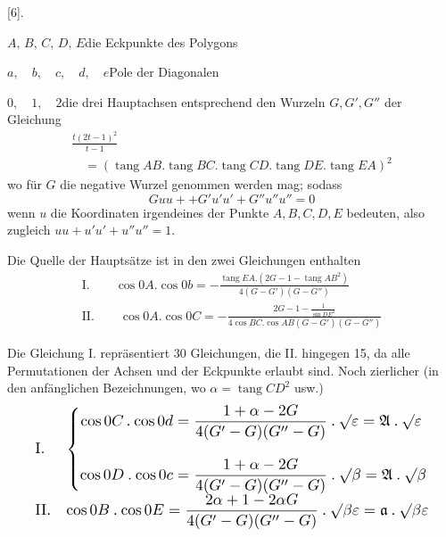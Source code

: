 \begingroup
\renewcommand{\arraystretch}{1.45}
\fancyhead[L]{}
\par\medskip{}\centerline{[6].}\nobreak\smallskip
\noindent\hspace*{2em}$A,\,B,\,C,\,D,\,E$\quad die Eckpunkte des Polygons\par
\noindent\hspace*{2em}$a,\quad b,\quad c,\quad d,\quad e$\quad Pole der Diagonalen\par
\noindent\hspace*{2em}$0,\quad1,\quad2$\quad die drei Hauptachsen entsprechend den Wurzeln
$G,G',G''$ der Gleichung
\[
\begin{gathered}\frac{t(2t-1)^2}{t-1}\\[9pt]\quad{}=(\operatorname{tang}AB\mathord{.}\operatorname{tang}BC\mathord{.}\operatorname{tang}CD\mathord{.}\operatorname{tang}DE\mathord{.}\operatorname{tang}EA)^2\end{gathered}
\]
wo für $G$ die negative Wurzel genommen werden mag; sodass
\[
Guu++G'u'u'+G''u''u''=0
\]
wenn $u$ die Koordinaten irgendeines der Punkte $A,B,C,D,E$ bedeuten,
also zugleich $uu+u'u'+u''u''=1$.


Die Quelle der Hauptsätze ist in den zwei Gleichungen enthalten
\[
\begin{gathered} \text{I.}\qquad\cos0A\mathord{.}\cos0b=-\frac{\operatorname{tang}EA\mathord{.}(2G-1-\operatorname{tang}AB^2)}{4(G-G')(G-G'')}\\[9pt] \text{II.}\qquad\cos0A\mathord{.}\cos0C=-\frac{2G-1-\frac{1}{\sin DE^2}}{4\cos BC\mathord{.}\cos AB(G-G')(G-G'')} \end{gathered}
\]



Die Gleichung I. repräsentiert 30 Gleichungen, die II. hingegen 15, da alle
Permutationen der Achsen und der Eckpunkte erlaubt sind. Noch zierlicher
(in den anfänglichen Bezeichnungen, wo $\alpha=\operatorname{tang}CD^2$ usw.)
\begingroup\small\setlength{\arraycolsep}{3pt}\[
\resizebox{.95\linewidth}{!}{$\displaystyle \begin{array}{ll} \mathrm{I.}&\left\{\begin{aligned} \cos 0C\mathbin{.}\cos 0d&=\frac{1+\alpha-2G}{4(G'-G)(G''-G)}\mathbin{.}\surd\varepsilon=\mathfrak{A}\mathbin{.}\surd\varepsilon\\[9pt] \cos 0D\mathbin{.}\cos 0c&=\frac{1+\alpha-2G}{4(G'-G)(G''-G)}\mathbin{.}\surd\beta=\mathfrak{A}\mathbin{.}\surd\beta \end{aligned}\right.\\[18pt] \mathrm{II.}&\displaystyle \cos 0B\mathbin{.}\cos 0E=\frac{2\alpha+1-2\alpha G}{4(G'-G)(G''-G)}\mathbin{.}\surd\beta\varepsilon=\mathfrak{a}\mathbin{.}\surd\beta\varepsilon \end{array}$}
\]\endgroup

